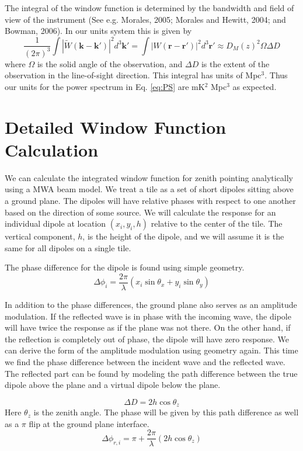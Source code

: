 \documentclass{article}
\begin{document}
The integral of the window function is determined by the bandwidth and field of view of the instrument (See e.g. Morales, 2005; Morales and Hewitt, 2004; and Bowman, 2006). In our units system this is given by
\begin{equation}
\frac{1}{(2\pi)^3} \int \left|\widetilde{W}(\mathbf{k}-\mathbf{k}')\right|^2 d^3\mathbf{k}' = \int \left|W(\mathbf{r}-\mathbf{r}')\right|^2 d^3 \mathbf{r}' \approx D_M(z)^2 \Omega \Delta D
\end{equation}
where $\Omega$ is the solid angle of the observation, and $\Delta D$ is the extent of the observation in the line-of-sight direction. This integral has units of Mpc$^3$. Thus our units for the power spectrum in Eq. \ref{eq:PS} are mK$^2$ Mpc$^3$ as expected.

\section{Detailed Window Function Calculation}
We can calculate the integrated window function for zenith pointing analytically using a MWA beam model. We treat a tile as a set of short dipoles sitting above a ground plane. The dipoles will have relative phases with respect to one another based on the direction of some source. We will calculate the response for an individual dipole at location $(x_i,y_i,h)$ relative to the center of the tile. The vertical component, $h$, is the height of the dipole, and we will assume it is the same for all dipoles on a single tile.

The phase difference for the dipole is found using simple geometry.
\begin{equation}
\Delta\phi_i = \frac{2\pi}{\lambda} (x_i \sin\theta_x+y_i \sin\theta_y)
\end{equation}

In addition to the phase differences, the ground plane also serves as an amplitude modulation. If the reflected wave is in phase with the incoming wave, the dipole will have twice the response as if the plane was not there. On the other hand, if the reflection is completely out of phase, the dipole will have zero response. We can derive the form of the amplitude modulation using geometry again. This time we find the phase difference between the incident wave and the reflected wave. The reflected part can be found by modeling the path difference between the true dipole above the plane and a virtual dipole below the plane.

\begin{equation}
\Delta D = 2 h \cos\theta_z
\end{equation}
Here $\theta_z$ is the zenith angle. The phase will be given by this path difference as well as a $\pi$ flip at the ground plane interface.
\begin{equation}
\Delta\phi_{r,i} = \pi + \frac{2 \pi}{\lambda} (2h \cos\theta_z)
\end{equation}
\end{document}
